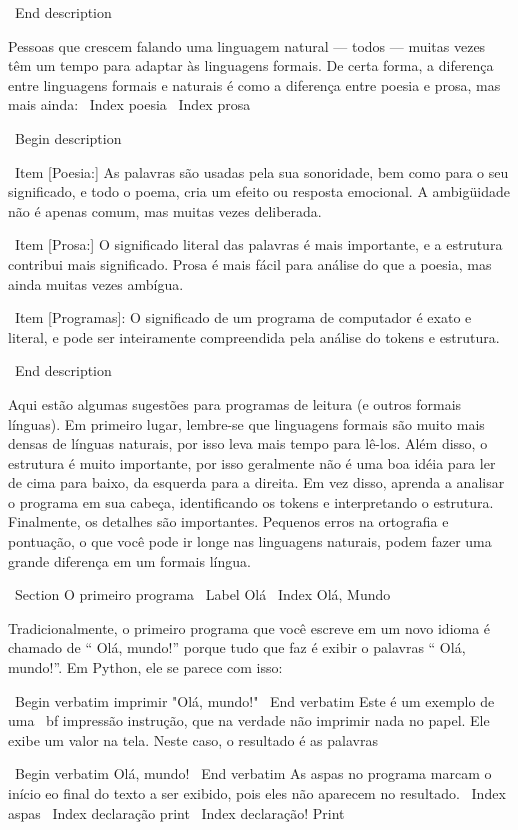 \documentclass[10pt]{book}
\begin{document}
{\ End {description}

Pessoas que crescem falando uma linguagem natural --- todos --- muitas vezes têm um
tempo para adaptar às linguagens formais. De certa forma, a diferença
entre linguagens formais e naturais é como a diferença entre
poesia e prosa, mas mais ainda:
\ Index {poesia}
\ Index {} prosa

\ Begin {description}

\ Item [Poesia:] As palavras são usadas pela sua sonoridade, bem como para
o seu significado, e todo o poema, cria um efeito ou
resposta emocional. A ambigüidade não é apenas comum, mas muitas vezes
deliberada.

\ Item [Prosa:] O significado literal das palavras é mais importante,
e a estrutura contribui mais significado. Prosa é mais fácil para
análise do que a poesia, mas ainda muitas vezes ambígua.

\ Item [Programas]: O significado de um programa de computador é exato
e literal, e pode ser inteiramente compreendida pela análise do
tokens e estrutura.

\ End {description}

Aqui estão algumas sugestões para programas de leitura (e outros formais
línguas). Em primeiro lugar, lembre-se que linguagens formais são muito mais densas
de línguas naturais, por isso leva mais tempo para lê-los. Além disso, o
estrutura é muito importante, por isso geralmente não é uma boa idéia para ler
de cima para baixo, da esquerda para a direita. Em vez disso, aprenda a analisar o
programa em sua cabeça, identificando os tokens e interpretando o
estrutura. Finalmente, os detalhes são importantes. Pequenos erros na
ortografia e pontuação, o que você pode ir longe
nas linguagens naturais, podem fazer uma grande diferença em um formais
língua.


\ Section {O primeiro programa}
\ Label {Olá}
\ Index {Olá, Mundo}

Tradicionalmente, o primeiro programa que você escreve em um novo idioma
é chamado de `` Olá, mundo!'' porque tudo que faz é exibir o
palavras `` Olá, mundo!''. Em Python, ele se parece com isso:

\ Begin {verbatim}
imprimir "Olá, mundo!"
\ End {verbatim}
%
Este é um exemplo de uma {\ bf impressão instrução}, que
na verdade não imprimir nada no papel. Ele exibe um valor na
tela. Neste caso, o resultado é as palavras

\ Begin {verbatim}
Olá, mundo!
\ End {verbatim}
%
As aspas no programa marcam o início eo final
do texto a ser exibido, pois eles não aparecem no resultado.
\ Index {aspas}
\ Index {declaração print}
\ Index {declaração! Print}

}
\end{document}

